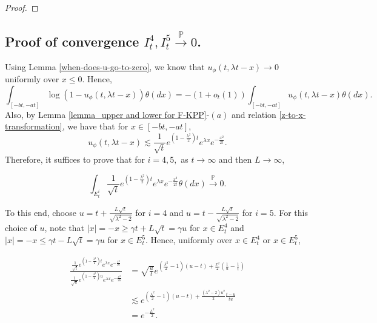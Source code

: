 \documentclass[a4paper,reqno]{amsart}%
\newcommand{\1}{\mathbf 1}
\theoremstyle{mine}
\numberwithin{theorem}{section}
\numberwithin{equation}{section}
\theoremstyle{remark}
\begin{document}
\begin{proof}
\end{proof}

\subsection{Proof of convergence $I_t^4, I_t^5 \overset{\mathbb{P}}{\to} 0$.} \label{subsection-for-I4/I5}

Using Lemma \ref{when-does-u-go-to-zero}, we know that $u_\phi(t, \lambda t -x) \to 0$ uniformly over $x \leq 0$. Hence,  
\begin{equation}\label{we-can-remove-log}
     \int_{[-bt, -at]}\log(1- u_\phi(t, \lambda t -x))\theta(dx) = -(1+ o_t(1)) \int_{[-bt, -at]}u_\phi(t, \lambda t -x)\theta(dx).
\end{equation}
Also, by Lemma \ref{lemma_upper and lower for F-KPP}-$(a)$ and relation \eqref{z-to-x-transformation}, we have that for $x\in [-bt, -at]$, 
\begin{equation}
    u_\phi(t, \lambda t -x) \lesssim \frac{1}{\sqrt{t}}e^{(1-\frac{\lambda^2}{2})t}e^{\lambda x}e^{-\frac{x^2}{2t}}.
\end{equation}
Therefore, it suffices to prove that for $i=4,5,$  as $t\to \infty$ and then $L\to \infty$,  

\begin{equation}\label{resolved-step-for-4-and-5}
    \int_{E_t^i} \frac{1}{\sqrt{t}}e^{(1-\frac{\lambda^2}{2})t}e^{\lambda x}e^{-\frac{x^2}{2t}} \theta(dx) \overset{\mathbb{P}}{\to} 0.
\end{equation}

\vspace{3mm}
To this end, choose $u = t + \frac{L\sqrt{t}}{\sqrt{\lambda^2 -2}}$ for $i=4$ and $u = t -\frac{L\sqrt{t}}{\sqrt{\lambda^2 -2}}$ for $i=5$. For this choice of $u$, note that  $|x| =-x \geq \gamma t + L\sqrt{t} = \gamma u$ for $x\in E_t^4$ and $|x| =-x \leq \gamma t - L\sqrt{t} = \gamma u$ for $x\in E_t^5$. Hence, uniformly over $x\in E_t^4$ or $x\in E_t^5$, 

\begin{equation}
    \begin{aligned}
        \frac{\frac{1}{\sqrt{t}}e^{(1-\frac{\lambda^2}{2})t}e^{\lambda x}e^{-\frac{x^2}{2t}}}{\frac{1}{\sqrt{u}}e^{(1-\frac{\lambda^2}{2})u}e^{\lambda x}e^{-\frac{x^2}{2u}}} 
        &= \sqrt{\frac{u}{t}}e^{(\frac{\lambda^2}{2}-1)(u-t) + \frac{x^2}{2}(\frac{1}{u}-\frac{1}{t})}\\
        &\lesssim e^{(\frac{\lambda^2}{2}-1)(u -t) + \frac{(\lambda^2-2)u^2}{2}\frac{t-u}{tu}}\\
        &=e^{-\frac{L^2}{2}}.
    \end{aligned}
    \end{equation}
\end{document}
